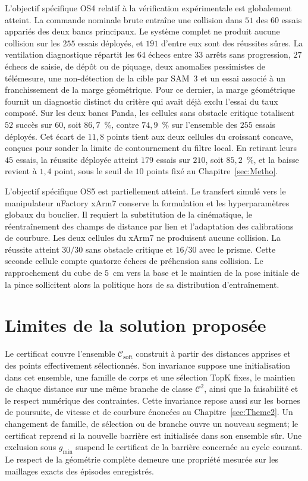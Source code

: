 L'objectif spécifique \acs{OS}4 relatif à la vérification expérimentale est globalement atteint. La commande nominale brute entraîne une collision dans $51$ des $60$ essais appariés des deux bancs principaux. Le système complet ne produit aucune collision sur les $255$ essais déployés, et $191$ d'entre eux sont des réussites sûres. La ventilation diagnostique répartit les $64$ échecs entre $33$ arrêts sans progression, $27$ échecs de saisie, de dépôt ou de piquage, deux anomalies pessimistes de télémesure, une non-détection de la cible par \ac{SAM}~3 et un essai associé à un franchissement de la marge géométrique. Pour ce dernier, la marge géométrique fournit un diagnostic distinct du critère qui avait déjà exclu l'essai du taux composé. Sur les deux bancs Panda, les cellules sans obstacle critique totalisent $52$ succès sur $60$, soit $86{,}7$~\%, contre $74{,}9$~\% sur l'ensemble des $255$ essais déployés. Cet écart de $11{,}8$ points tient aux deux cellules du croissant concave, conçues pour sonder la limite de contournement du filtre local. En retirant leurs $45$ essais, la réussite déployée atteint $179$ essais sur $210$, soit $85{,}2$~\%, et la baisse revient à $1{,}4$ point, sous le seuil de $10$ points fixé au Chapitre~\ref{sec:Metho}.

L'objectif spécifique \acs{OS}5 est partiellement atteint. Le transfert simulé vers le manipulateur uFactory xArm7 conserve la formulation et les hyperparamètres globaux du bouclier. Il requiert la substitution de la cinématique, le réentraînement des champs de distance par lien et l'adaptation des calibrations de courbure. Les deux cellules du xArm7 ne produisent aucune collision. La réussite atteint $30/30$ sans obstacle critique et $16/30$ avec le prisme. Cette seconde cellule compte quatorze échecs de préhension sans collision. Le rapprochement du cube de $5$~cm vers la base et le maintien de la pose initiale de la pince sollicitent alors la politique hors de sa distribution d'entraînement.

\section{Limites de la solution proposée}\label{sec:Limitations}

Le certificat couvre l'ensemble $\mathcal{C}_{\mathrm{soft}}$ construit à partir des distances apprises et des points effectivement sélectionnés. Son invariance suppose une initialisation dans cet ensemble, une famille de corps et une sélection TopK fixes, le maintien de chaque distance sur une même branche de classe $\mathcal{C}^2$, ainsi que la faisabilité et le respect numérique des contraintes. Cette invariance repose aussi sur les bornes de poursuite, de vitesse et de courbure énoncées au Chapitre~\ref{sec:Theme2}. Un changement de famille, de sélection ou de branche ouvre un nouveau segment; le certificat reprend si la nouvelle barrière est initialisée dans son ensemble sûr. Une exclusion sous $g_{\min}$ suspend le certificat de la barrière concernée au cycle courant. Le respect de la géométrie complète demeure une propriété mesurée sur les maillages exacts des épisodes enregistrés.

